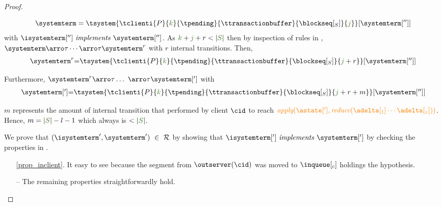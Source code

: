 \begin{proof}
\begin{itemize}
\begin{itemize}
\begin{itemize}
				\[\systemterm = \tsystem{\tclienti{\tprogram}{\tknown}{\tpending}{\ttransactionbuffer}{\tsent}{\treceivebuffer}}[{\systemterm['']}] \]
				with $\implements{\isystemterm['']}{\systemterm['']}$. As $\tknown+ \treceivebuffer + r < |\queuemessage|$ then by inspection of rules in 				, 
				$\systemterm \arroi{\tau}\cdots\arroi{\tau} \systemterm^{r}$ with $r$ internal transitions. Then,
				\[\begin{array}{r@{=}l}
						\systemterm^{r} & \tsystem{\tclienti{\tprogram}{\tknown}{\tpending}{\ttransactionbuffer}{\tsent}{\treceivebuffer+r}}[{\systemterm['']}]	
				  \end{array}		
				\]
				
				Furthermore,
				$\systemterm^{r} \arroi{\tau} \ldots\ \arroi{\tau} \systemterm[']$ with
				\[\begin{array}{r@{=}l}
					\systemterm['] &  \tsystem{\tclienti{\tprogram}{\tknown}{\tpending}{\ttransactionbuffer}{\tsent}{\treceivebuffer + r + m}}[{\systemterm['']}] \\
				  \end{array}		
				\]


				$m$ represents the amount of internal transition that performed by client $\cid$ to reach $\iapply{\astate[']}{\ireduce{\adelta[_1]\cdots\adelta[_{z}]}}$. Hence, $m =  |\queuemessage| - l - 1$ which always is $< |\queuemessage|$.   


								
				We  prove that $(\isystemterm',\systemterm') \ \in \ \mathcal{R}$ by showing that $\implements{\isystemterm[']}{\systemterm[']}$ 
				by checking the properties in .	
				\begin{itemize}	
	
					\item[\ref{prop_inclient}.] It easy to see because the segment from $\outserver(\cid)$ was moved to $\inclient$ holdings the hypothesis.
					
					
					\item[{--}] The remaining properties straightforwardly hold.
							
				\end{itemize}	
	
					
							
				\end{itemize}


\end{itemize}
\end{itemize}
\end{proof}
